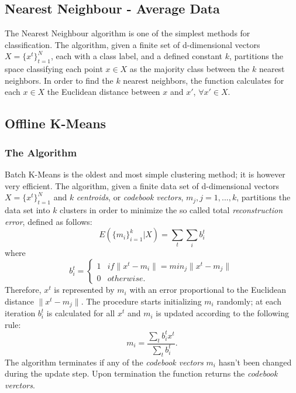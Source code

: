 \documentclass{lmproj}
\begin{document}
\subsection{Nearest Neighbour - Average Data}
The Nearest Neighbour algorithm is one of the simplest methods for classification. The algorithm, given a finite set of d-dimensional vectors $X=\{x^t\}_{t=1}^{N}$, each with a class label, and a defined constant $k$, partitions the space classifying each point $x \in X$ as the majority class between the $k$ nearest neighbors. In order to find the $k$ nearest neighbors, the function calculates for each $x \in X$ the Euclidean distance between $x$ and $x'$, $\forall x' \in X$.
\subsection{Offline K-Means}
\subsubsection{The Algorithm}
Batch K-Means is the oldest and most simple clustering method; it is however very efficient. The algorithm, given a finite data set of d-dimensional vectors $X=\{x^t\}_{t=1}^{N}$ and $k$ \textit{centroids}, or \textit{codebook vectors}, $m_j,j=1,...,k$, partitions the data set into $k$ clusters in order to minimize the so called total \textit{reconstruction error}, defined as follows:
\begin{equation}
E(\{m_i\}^k_{i=1}|X)=\underset{t}{\sum}\underset{i}{\sum}b_i^t
\end{equation}
where
\begin{equation}
b_i^t=
\begin{cases}
1 & if \parallel x^t -m_i \parallel = min_j \parallel x^t - m_j \parallel \\
0 & otherwise.
\end{cases}
\end{equation}
Therefore, $x^t$ is represented by $m_i$ with an error proportional to the Euclidean distance $\parallel x^t - m_j \parallel$. The procedure starts initializing $m_i$ randomly; at each iteration $b_i^t$ is calculated for all $x^t$ and $m_i$ is updated according to the following rule:
\begin{equation}
m_i=\dfrac{\sum_t b_i^t x^t}{\sum_t b_i^t}.
\end{equation}
The algorithm terminates if any of the \textit{codebook vectors} $m_i$ hasn't been changed during the update step. Upon termination the function returns the \textit{codebook verctors}\cite{Clustering}.
\end{document}
